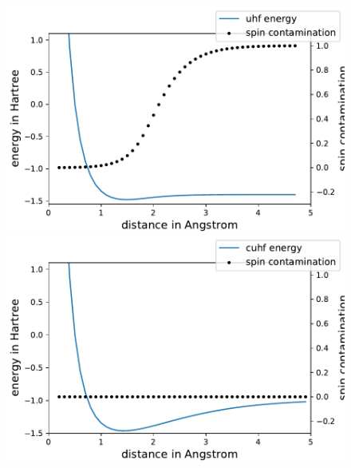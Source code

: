 \documentclass[aspectratio=169]{beamer}
\begin{document}
\begin{frame}
    \frametitle{}
    \begin{figure}
        \begin{minipage}[b]{0.45\linewidth}
            \includegraphics[width=\linewidth]{./figures/h3_uhf_sto-3g.pdf}
        \end{minipage}
        \begin{minipage}[b]{0.45\linewidth}
            \includegraphics[width=\linewidth]{./figures/h3_cuhf.pdf}
        \end{minipage}
    \end{figure}

\end{frame}
\end{document}
